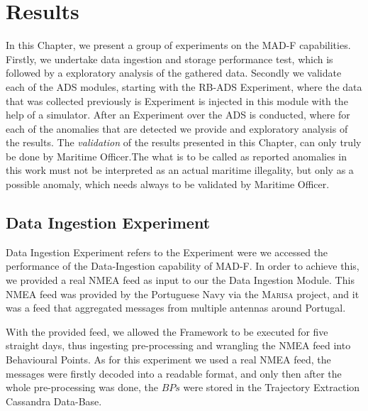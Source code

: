 \chapter{Results}
\label{chapter:Chapter 5}

In this Chapter, we present a group of experiments on the MAD-F capabilities. Firstly, we undertake data ingestion and storage performance test, which is followed by a exploratory analysis of the gathered data. Secondly we validate each of the ADS modules, starting with the RB-ADS Experiment, where the data that was collected previously is Experiment is injected in this module with the help of a simulator. After an Experiment over the ADS is conducted, where for each of the anomalies that are detected we provide and exploratory analysis of the results.
The \emph{validation} of the results presented in this Chapter, can only truly be done by Maritime Officer.The what is to be called as reported anomalies in this work must not be interpreted as an actual maritime illegality, but only as a possible anomaly, which needs always to be validated by Maritime Officer.


\section{Data Ingestion Experiment}
\label{section: Experiment Data}
Data Ingestion Experiment refers to the Experiment were we accessed the performance of the Data-Ingestion capability of MAD-F. In order to achieve this, we provided a real NMEA feed as input to our the Data Ingestion Module. This NMEA feed was provided by the Portuguese Navy via the \textsc{Marisa} project, and it was a feed that aggregated messages from multiple antennas around Portugal.
 
With the provided feed, we allowed the Framework to be executed for five straight days, thus ingesting pre-processing and wrangling the NMEA feed into Behavioural Points. As for this experiment we used a real NMEA feed, the messages were firstly decoded into a readable format, and only then after the whole pre-processing was done, the $BPs$ were stored in the Trajectory Extraction Cassandra Data-Base.

